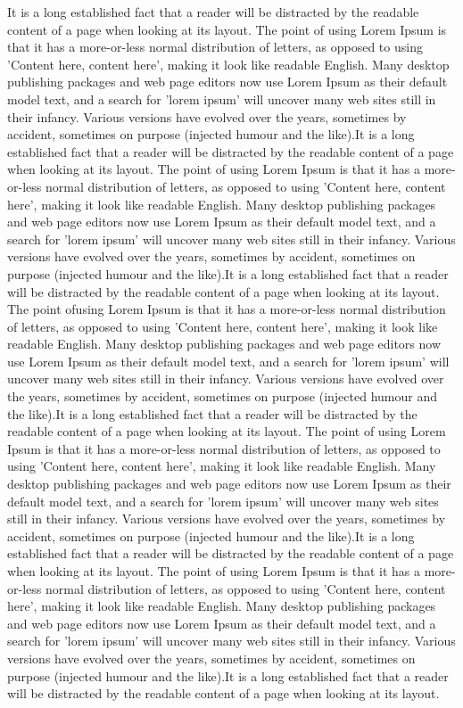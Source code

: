 It is a long established fact that a reader will be distracted by the readable content of a page when looking at its layout. The point of using Lorem Ipsum is that it has a more-or-less normal distribution of letters, as opposed to using 'Content here, content here', making it look like readable English. Many desktop publishing packages and web page editors now use Lorem Ipsum as their default model text, and a search for 'lorem ipsum' will uncover many web sites still in their infancy. Various versions have evolved over the years, sometimes by accident, sometimes on purpose (injected humour and the like).It is a long established fact that a reader will be distracted by the readable content of a page when looking at its layout. The point of using Lorem Ipsum is that it has a more-or-less normal distribution of letters, as opposed to using 'Content here, content here', making it look like readable English. Many desktop publishing packages and web page editors now use Lorem Ipsum as their default model text, and a search for 'lorem ipsum' will uncover many web sites still in their infancy. Various versions have evolved over the years, sometimes by accident, sometimes on purpose (injected humour and the like).It is a long established fact that a reader will be distracted by the readable content of a page when looking at its layout. 
The point ofusing Lorem Ipsum is that it has a more-or-less normal distribution of letters, as opposed to using 'Content here, content here', making it look like readable English. Many desktop publishing packages and web page editors now use Lorem Ipsum as their default model text, and a search for 'lorem ipsum' will uncover many web sites still in their infancy. Various versions have evolved over the years, sometimes by accident, sometimes on purpose (injected humour and the like).It is a long established fact that a reader will be distracted by the readable content of a page when looking at its layout. The point of using Lorem Ipsum is that it has a more-or-less normal distribution of letters, as opposed to using 'Content here, content here', making it look like readable English. Many desktop publishing packages and web page editors now use Lorem Ipsum as their default model text, and a search for 'lorem ipsum' will uncover many web sites still in their infancy. Various versions have evolved over the years, sometimes by accident, sometimes on purpose (injected humour and the like).It is a long established fact that a reader will be distracted by the readable content of a page when looking at its layout. The point of using Lorem Ipsum is that it has a more-or-less normal distribution of letters, as opposed to using 'Content here, content here', making it look like readable English. Many desktop publishing packages and web page editors now use Lorem Ipsum as their default model text, and a search for 'lorem ipsum' will uncover many web sites still in their infancy. Various versions have evolved over the years, sometimes by accident, sometimes on purpose (injected humour and the like).It is a long established fact that a reader will be distracted by the readable content of a page when looking at its layout. 
